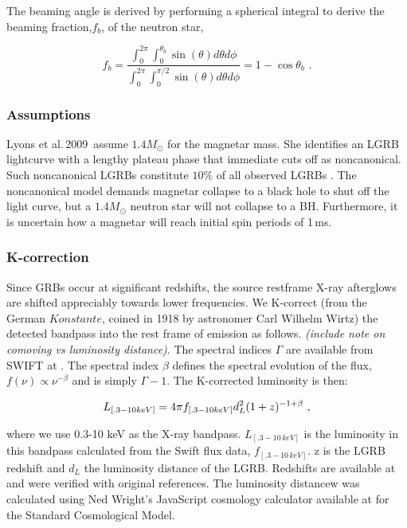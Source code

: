 \documentclass{article}
\begin{document}
The beaming angle is derived by performing a spherical integral to derive the beaming fraction,$f_b$, of the neutron star,

\begin{equation}
f_b=\frac{\int_0^{2\pi} \int_0^{\theta_b} \sin(\theta) d\theta d\phi}{\int_0^{2\pi} \int_0^{\pi/2} \sin(\theta) d\theta d\phi} = 1-\cos{\theta_b}\,\,.
\end{equation}

\subsubsection{Assumptions}

Lyons et al.\,2009\,\cite{Lyons:2009ka} assume $1.4 M_{\odot}$ for the magnetar mass. She identifies an LGRB lightcurve with a lengthy plateau phase that immediate cuts off as noncanonical. Such noncanonical LGRBs constitute $10\%$ of all observed LGRBs \cite{Lyons:2009ka}. The noncanonical model demands magnetar collapse to a black hole to shut off the light curve, but a $1.4 M_{\odot}$  neutron star will not collapse to a BH. Furthermore, it is uncertain how a magnetar will reach initial spin periods of 1\,ms.

\subsubsection{K-correction}
Since GRBs occur at significant redshifts, the source restframe X-ray afterglows are shifted appreciably towards lower frequencies. We K-correct (from the German $Konstante$, coined in 1918 by astronomer Carl Wilhelm Wirtz) the detected bandpass into the rest frame of emission  as follows. \textit{(include note on comoving vs luminosity distance)}. The spectral indices $\Gamma$ are available from SWIFT at \cite{swift}. The spectral index $\beta$ defines the spectral evolution of the flux, $f(\nu) \propto \nu^{-\beta}$ and is simply $\Gamma -1$. The K-corrected luminosity is then:

\begin{equation} L_{[.3-10 keV]} = 4\pi\* f_{[.3-10 keV]}d_{L}^2  (1+z)^{-1+\beta}\,\,,
\end{equation}

where we use 0.3-10 keV as the X-ray bandpass.  $L_{[.3-10\,keV]}$ is the luminosity in this bandpass calculated from the Swift flux data,  $f_{[.3-10\,keV]}$. z is the LGRB redshift and $d_L$ the luminosity distance of the LGRB. Redshifts are available at \cite{grbhosts} and were verified with original references. The luminosity distancew was calculated using Ned Wright's JavaScript cosmology calculator available at \cite{cosmoc} for the Standard Cosmological Model.
\end{document}
